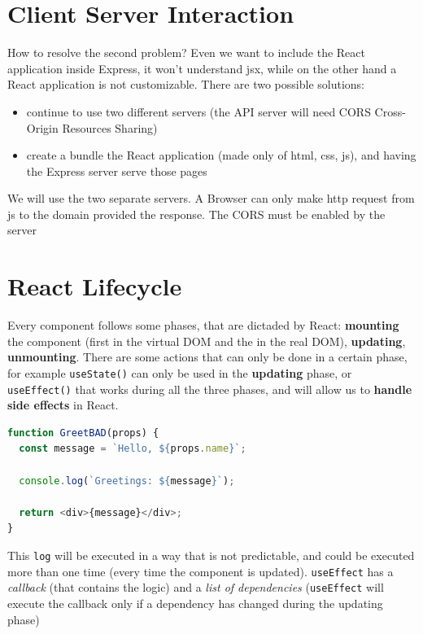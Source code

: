 \documentclass[12pt]{article}
\begin{document}
\section{Client Server Interaction}
How to resolve the second problem? Even we want to include the React application inside Express, it won't understand jsx, while on the other hand a React application is not customizable. There are two possible solutions:
\begin{itemize}
  \item continue to use two different servers (the API server will need CORS Cross-Origin Resources Sharing)
  \item create a bundle the React application (made only of html, css, js), and having the Express server serve those pages
\end{itemize}
We will use the two separate servers. A Browser can only make http request from js to the domain provided the response. The CORS must be enabled by the server



\section{React Lifecycle}
Every component follows some phases, that are dictaded by React: \textbf{mounting} the component (first in the virtual DOM and the in the real DOM), \textbf{updating}, \textbf{unmounting}. There are some actions that can only be done in a certain phase, for example \texttt{useState()} can only be used in the \textbf{updating} phase, or \texttt{useEffect()} that works during all the three phases, and will allow us to \textbf{handle side effects} in React.
\begin{lstlisting}[language=js]
function GreetBAD(props) {
  const message = `Hello, ${props.name}`;

  console.log(`Greetings: ${message}`);

  return <div>{message}</div>;
}
\end{lstlisting}
This \texttt{log} will be executed in a way that is not predictable, and could be executed more than one time (every time the component is updated). \texttt{useEffect} has a \emph{callback} (that contains the logic) and a \emph{list of dependencies} (\texttt{useEffect} will execute the callback only if a dependency has changed during the updating phase)
 
\end{document}
